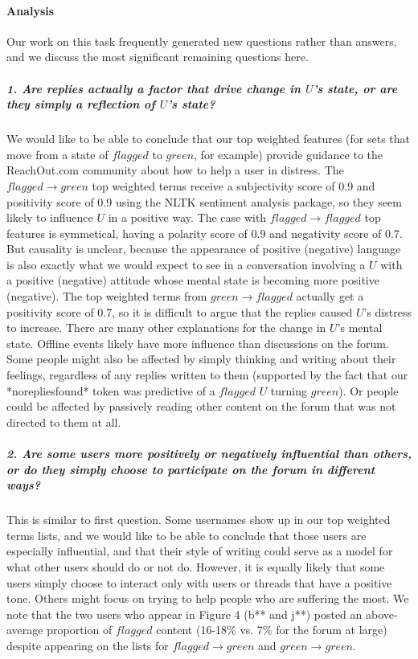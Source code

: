 \documentclass{article}
\begin{document}
\paragraph{Analysis}Our work on this task frequently generated new questions rather than answers, and we discuss the most significant remaining questions here.

\subparagraph{1. Are replies actually a factor that drive change in $U$'s state, or are they simply a reflection of $U$'s state?}We would like to be able to conclude that our top weighted features (for sets that move from a state of $flagged$ to $green$, for example) provide guidance to the ReachOut.com community about how to help a user in distress. The $flagged \rightarrow green$ top weighted terms receive a subjectivity score of 0.9 and positivity score of 0.9 using the NLTK sentiment analysis package, so they seem likely to influence $U$ in a positive way. The case with $flagged \rightarrow flagged$ top features is symmetical, having a polarity score of 0.9 and negativity score of 0.7. But causality is unclear, because the appearance of positive (negative) language is also exactly what we would expect to see in a conversation involving a $U$ with a positive (negative) attitude whose mental state is becoming more positive (negative). The top weighted terms from $green \rightarrow flagged$ actually get a positivity score of 0.7, so it is difficult to argue that the replies caused $U$'s distress to increase. There are many other explanations for the change in $U$'s mental state. Offline events likely have more influence than discussions on the forum. Some people might also be affected by simply thinking and writing about their feelings, regardless of any replies written to them (supported by the fact that our *norepliesfound* token was predictive of a $flagged$ $U$ turning $green$). Or people could be affected by passively reading other content on the forum that was not directed to them at all.

\subparagraph{2. Are some users more positively or negatively influential than others, or do they simply choose to participate on the forum in different ways?}This is similar to first question. Some usernames show up in our top weighted terms lists, and we would like to be able to conclude that those users are especially influential, and that their style of writing could serve as a model for what other users should do or not do. However, it is equally likely that some users simply choose to interact only with users or threads that have a positive tone. Others might focus on trying to help people who are suffering the most. We note that the two users who appear in Figure 4 (b** and j**) posted an above-average proportion of $flagged$ content (16-18\% vs. 7\% for the forum at large) despite appearing on the lists for $flagged \rightarrow green$ and $green \rightarrow green$.
\end{document}
